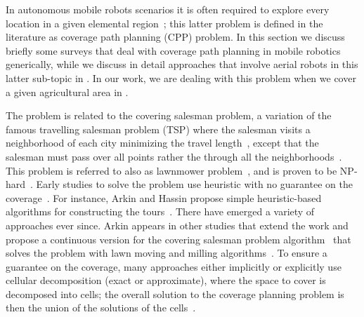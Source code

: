 In autonomous mobile robots scenarios it is often required to explore every location in a given elemental region~\citep{cao1988region}; this latter problem is defined in the literature as coverage path planning (CPP) problem.
In this section we discuss briefly some surveys that deal with coverage path planning in mobile robotics generically, while we discuss in detail approaches that involve aerial robots in this latter sub-topic in . In our work, we are dealing with this problem when we cover a given agricultural area in . 

The problem is related to the covering salesman problem, a variation of the famous travelling salesman problem (TSP) where the salesman visits a neighborhood of each city minimizing the travel length~\citep{arkin1994approximation}, except that the salesman must pass over all points rather the through all the neighborhoods~\citep{choset2001coverage}. This problem is referred to also as lawnmower problem~\citep{galceran2013survey}, and is proven to be NP-hard~\citep{arkin2000approximation}. Early studies to solve the problem use heuristic with no guarantee on the coverage~\citep{choset2001coverage}. For instance, Arkin and Hassin propose simple heuristic-based algorithms for constructing the tours~\citep{arkin1994approximation}. There have emerged a variety of approaches ever since. Arkin appears in other studies that extend the work and propose a continuous version for the covering salesman problem algorithm~\citep{arkin1993lawnmower,fekete1994lawnmower,arkin2000approximation} that solves the problem with lawn moving and milling algorithms~\citep{arkin2000approximation}. To ensure a guarantee on the coverage, many approaches either implicitly or explicitly use cellular decomposition (exact or approximate), where the space to cover is decomposed into cells; the overall solution to the coverage planning problem is then the union of the solutions of the cells~\citep{choset2001coverage}. 

